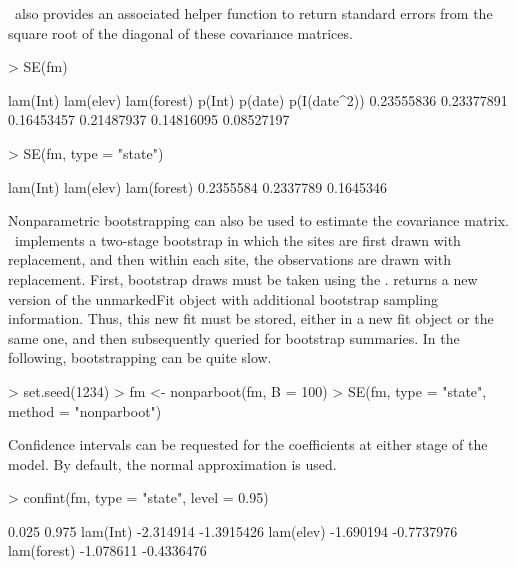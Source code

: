 \documentclass[article,shortnames]{jss}
\newcommand{\um}{\pkg{unmarked}}
\begin{document}
\um\ also provides an associated helper function  to return
standard errors from the square root of the diagonal of these
covariance matrices.

\begin{Schunk}
\begin{Sinput}
> SE(fm)
\end{Sinput}
\begin{Soutput}
    lam(Int)    lam(elev)  lam(forest)       p(Int)      p(date) p(I(date^2)) 
  0.23555836   0.23377891   0.16453457   0.21487937   0.14816095   0.08527197 
\end{Soutput}
\begin{Sinput}
> SE(fm, type = "state")
\end{Sinput}
\begin{Soutput}
   lam(Int)   lam(elev) lam(forest) 
  0.2355584   0.2337789   0.1645346 
\end{Soutput}
\end{Schunk}

Nonparametric bootstrapping can also be used to estimate the
covariance matrix. \um\ implements a two-stage bootstrap in which the
sites are first drawn with replacement, and then within each site, the
observations are drawn with replacement.  First, bootstrap draws must
be taken using the .   returns a new
version of the unmarkedFit object with additional bootstrap sampling
information.  Thus, this new fit must be stored, either in a new fit
object or the same one, and then subsequently queried for bootstrap
summaries.  In the following, bootstrapping can be quite slow.

\begin{Schunk}
\begin{Sinput}
> set.seed(1234)
> fm <- nonparboot(fm, B = 100)
> SE(fm, type = "state", method = "nonparboot")
\end{Sinput}
\end{Schunk}

Confidence intervals can be requested for the coefficients at either
stage of the model.  By default, the normal approximation is used.

\begin{Schunk}
\begin{Sinput}
> confint(fm, type = "state", level = 0.95)
\end{Sinput}
\begin{Soutput}
                0.025      0.975
lam(Int)    -2.314914 -1.3915426
lam(elev)   -1.690194 -0.7737976
lam(forest) -1.078611 -0.4336476
\end{Soutput}
\end{Schunk}
\end{document}
